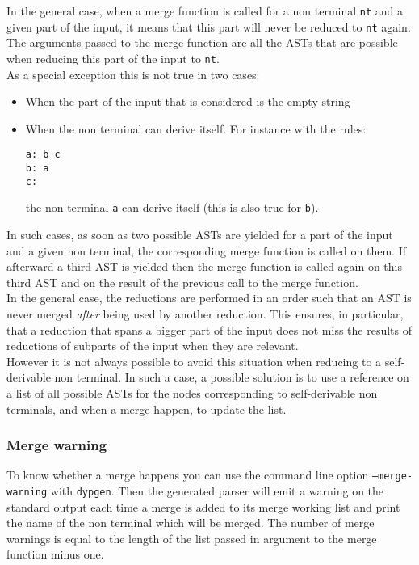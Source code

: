 \documentclass[12pt]{article}
\begin{document}
{In the general case, when a merge function is called for a non terminal \verb|nt| and a given part of the input, it means that this part will never be reduced to \verb|nt| again. The arguments passed to the merge function are all the ASTs that are possible when reducing this part of the input to \verb|nt|.\\

As a special exception this is not true in two cases:
\begin{itemize}
\item When the part of the input that is considered is the empty string
\item When the non terminal can derive itself. For instance with the rules:
\begin{verbatim}
a: b c
b: a
c:
\end{verbatim}
the non terminal \verb|a| can derive itself (this is also true for \verb|b|).
\end{itemize}
In such cases, as soon as two possible ASTs are yielded for a part of the input and a given non terminal, the corresponding merge function is called on them. If afterward a third AST is yielded then the merge function is called again on this third AST and on the result of the previous call to the merge function.\\

In the general case, the reductions are performed in an order such that an AST is never merged \emph{after} being used by another reduction. This ensures, in particular, that a reduction that spans a bigger part of the input does not miss the results of reductions of subparts of the input when they are relevant.\\

However it is not always possible to avoid this situation when reducing to a self-derivable non terminal. In such a case, a possible solution is to use a reference on a list of all possible ASTs for the nodes corresponding to self-derivable non terminals, and when a merge happen, to update the list.

\subsubsection{Merge warning}

To know whether a merge happens you can use the command line option \texttt{--merge-warning} with \texttt{dypgen}. Then the generated parser will emit a warning on the standard output each time a merge is added to its merge working list and print the name of the non terminal which will be merged. The number of merge warnings is equal to the length of the list passed in argument to the merge function minus one.\\

}
\end{document}
